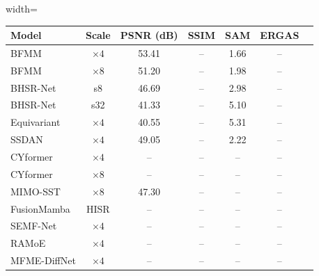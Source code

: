\documentclass[conference]{IEEEtran}
\begin{document}
\begin{table}[htbp]
\begin{center}
\begin{adjustbox}{width=\columnwidth}
\begin{tabular}{lcccccc}
\toprule
\textbf{Model} & \textbf{Scale} & \textbf{PSNR (dB)} & \textbf{SSIM} & \textbf{SAM} & \textbf{ERGAS} \\
\midrule
BFMM \cite{li2026bfmm} & $\times 4$ & 53.41 & -- & 1.66 & -- \\
BFMM \cite{li2026bfmm} & $\times 8$ & 51.20 & -- & 1.98 & -- \\
BHSR-Net \cite{dou2026bhsrnet} & s8 & 46.69 & -- & 2.98 & -- \\
BHSR-Net \cite{dou2026bhsrnet} & s32 & 41.33 & -- & 5.10 & -- \\
Equivariant \cite{wang2026equivariant} & $\times 4$ & 40.55 & -- & 5.31 & -- \\
SSDAN \cite{ssdan2026} & $\times 4$ & 49.05 & -- & 2.22 & -- \\
CYformer \cite{chen2025cyformer} & $\times 4$ & -- & -- & -- & -- \\
CYformer \cite{chen2025cyformer} & $\times 8$ & -- & -- & -- & -- \\
MIMO-SST \cite{fang2024mimosst} & $\times 8$ & 47.30 & -- & -- & -- \\
FusionMamba \cite{peng2024fusionmamba} & HISR & -- & -- & -- & -- \\
SEMF-Net \cite{semfnet2026} & $\times 4$ & -- & -- & -- & -- \\
RAMoE \cite{ramoe2026} & $\times 4$ & -- & -- & -- & -- \\
MFME-DiffNet \cite{mfme2026} & $\times 4$ & -- & -- & -- & -- \\
\bottomrule
\end{tabular}
\end{adjustbox}
\label{tab:cave}
\end{center}
\end{table}
\end{document}
